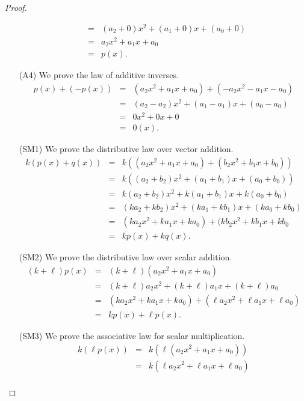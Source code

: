 \begin{proof}
\begin{itemize}
\begin{eqnarray*}
                   &=&  (a_2 + 0)x^2 + (a_1 + 0)x + (a_0 + 0)\\
                   &=&  a_2x^2 + a_1x + a_0 \\
                   &=&  p(x).
    \end{eqnarray*}
  \item[(A4)] We prove the law of additive inverses.
    \begin{eqnarray*}
      p(x) + (-p(x)) &=& (a_2x^2 + a_1x + a_0) + (- a_2x^2  - a_1x - a_0) \\
                     &=& (a_2 - a_2)x^2 + (a_1 - a_1)x + (a_0 - a_0) \\
                     &=& 0x^2 + 0x + 0 \\
                     &=& 0(x).
    \end{eqnarray*}
  \item[(SM1)] We prove the distributive law over vector addition.
    \begin{eqnarray*}
      k(p(x) + q(x)) &=& k ((a_2x^2 + a_1x + a_0) + (b_2x^2 + b_1x + b_0)) \\
                     &=& k ((a_2 + b_2)x^2 + (a_1 + b_1)x + (a_0 + b_0)) \\
                     &=& k(a_2 + b_2)x^2 + k(a_1 + b_1)x + k(a_0 + b_0) \\
                     &=& (ka_2 + kb_2)x^2 + (ka_1 + kb_1)x + (ka_0 + kb_0) \\
                     &=& (ka_2x^2 + ka_1x + ka_0) + (kb_2x^2 + kb_1x + kb_0 \\
                     &=& kp(x) + kq(x).
    \end{eqnarray*}
  \item[(SM2)] We prove the distributive law over scalar addition.
    \begin{eqnarray*}
      (k + \ell) p(x) &=& (k + \ell) (a_2x^2 + a_1x + a_0)\\
                 &=& (k + \ell)a_2x^2 + (k + \ell)a_1x + (k + \ell)a_0   \\
                 &=& (ka_2x^2 + ka_1x + ka_0) + (\ell a_2x^2 + \ell a_1x + \ell a_0)\\
                 &=& kp(x) + \ell p(x).
    \end{eqnarray*}
  \item[(SM3)] We prove the associative law for scalar multiplication.
    \begin{eqnarray*}
      k(\ell p(x)) &=& k(\ell(a_2x^2 + a_1x + a_0)) \\
               &=& k(\ell a_2x^2 + \ell a_1x + \ell a_0)\\

\end{eqnarray*}
\end{itemize}
\end{proof}
